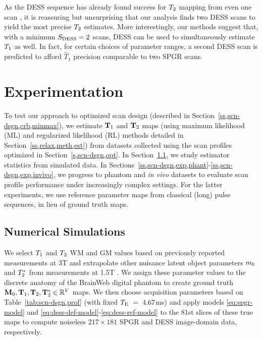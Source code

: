 As the DESS sequence has already found success 
for $T_2$ mapping from even one scan \cite{welsch:09:reo}, 
it is reassuring but unsurprising that our analysis finds two DESS scans 
to yield the most precise $T_2$ estimates. 
More interestingly, 
our methods suggest that, 
with a minimum $S_{\mathrm{DESS}} = 2$ scans, 
DESS can be used to simultaneously estimate $T_1$ as well. 
In fact, for certain choices of parameter ranges, 
a second DESS scan is predicted 
to afford $\widehat{T}_1$ precision 
comparable to two SPGR scans. 

\section{Experimentation}
\label{s,scn-dsgn,exp}

To test our approach 
to optimized scan design 
(described in Section~\ref{ss,scn-dsgn,crb,minmax}), 
we estimate $\mathbf{T}_1$ and $\mathbf{T}_2$ maps 
(using maximum likelihood (ML) and 
regularized likelihood (RL) methods 
detailed in Section~\ref{ss,relax,meth,est}) 
from datasets collected 
using the scan profiles 
optimized in Section~\ref{s,scn-dsgn,opt}. 
In Section~\ref{ss,scn-dsgn,exp,sim}, 
we study estimator statistics from simulated data.
In Sections~\ref{ss,scn-dsgn,exp,phant}-\ref{ss,scn-dsgn,exp,invivo}, 
we progress to phantom and \emph{in vivo} datasets 
to evaluate scan profile performance 
under increasingly complex settings.
For the latter experiments, 
we use reference parameter maps 
from classical (long) pulse sequences, 
in lieu of ground truth maps.

\subsection{Numerical Simulations}
\label{ss,scn-dsgn,exp,sim}

We select $T_1$ and $T_2$ WM and GM values 
based on previously reported measurements 
at 3T \cite{wansapura:99:nrt, stanisz:05:ttr} 
and extrapolate other nuisance latent object parameters 
$m_0$ and $T_2^*$
from measurements at 1.5T \cite{kwan:99:msb}. 
We assign these parameter values
to the discrete anatomy 
of the BrainWeb digital phantom 
\cite{collins:98:dac, kwan:99:msb} 
to create ground truth $\mathbf{M}_0, \mathbf{T}_1, \mathbf{T}_2, \mathbf{T}_2^* \in \mathbb{R}^{V}$ maps. 
We then choose acquisition parameters based 
on Table~\ref{tab:scn-dsgn,prof} 
(with fixed $T_\mathrm{E}~=~4.67$ms) 
and apply models \eqref{eq:spgr-model} 
and \eqref{eq:dess-def-model}-\eqref{eq:dess-ref-model} 
to the 81st slices of these true maps 
to compute noiseless $217 \times 181$ SPGR and DESS image-domain data, 
respectively. 

